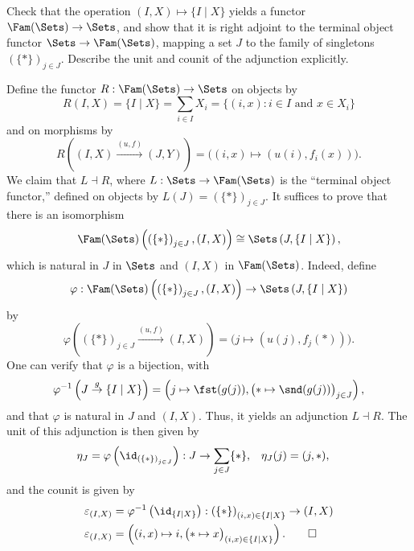 \begin{exercise}
Check that the operation \((I, X) \mapsto \{I \mid X\}\) yields a functor \(\Fam(\Sets) \to \Sets\), and show that it is right adjoint to the terminal object functor \(\Sets \to \Fam(\Sets)\), mapping a set \(J\) to the family of singletons \((\{*\})_{j \in J}\).
Describe the unit and counit of the adjunction explicitly.
\end{exercise}

\begin{solution}
Define the functor \(R : \Fam(\Sets) \to \Sets\) on objects by
\begin{equation*}
R(I, X) = \{I \mid X\} = \sum_{i \in I} X_i = \big\{(i, x) : \text{\(i \in I\) and \(x \in X_i\)}\big\}
\end{equation*}
and on morphisms by
\begin{equation*}
R\left((I, X) \xrightarrow{(u, f)} (J, Y)\right)
= \big((i, x) \mapsto (u(i), f_i(x))\big).
\end{equation*}
We claim that \(L \dashv R\), where \(L : \Sets \to \Fam(\Sets)\) is the ``terminal object functor,'' defined on objects by \(L(J) = \left(\{*\}\right)_{j \in J}\).
It suffices to prove that there is an isomorphism
\begin{equation*}
\Fam(\Sets)\left(\left(\{*\}\right)_{j \in J}, (I, X)\right)
\cong \Sets\left(J, \{I \mid X\}\right),
\end{equation*}
which is natural in \(J\) in \(\Sets\) and \((I, X)\) in \(\Fam(\Sets)\).
Indeed, define
\begin{equation*}
\varphi : \Fam(\Sets)\left(\left(\{*\}\right)_{j \in J}, (I, X)\right)
\to \Sets\left(J, \{I \mid X\}\right)
\end{equation*}
by
\begin{equation*}
\varphi\left(\left(\{*\}\right)_{j \in J} \xrightarrow{(u, f)} (I, X)\right)
= \big(j \mapsto (u(j), f_j(*))\big).
\end{equation*}
One can verify that \(\varphi\) is a bijection, with
\begin{equation*}
\varphi^{-1}\left(J \overset{g}{\to} \{I \mid X\}\right)
= \left(j \mapsto \fst (g(j)) , \big(* \mapsto \snd(g(j))\big)_{j \in J}\right),
\end{equation*}
and that \(\varphi\) is natural in \(J\) and \((I, X)\).
Thus, it yields an adjunction \(L \dashv R\).
The unit of this adjunction is then given by
\begin{align*}
\eta_J &= \varphi\left(\id_{\left(\{*\}\right)_{j \in J}}\right): J \to \sum_{j \in J} \{*\}, &
\eta_J(j) &= (j, *),
\end{align*}
and the counit is given by
\begin{align*}
\varepsilon_{(I, X)}
&= \varphi^{-1}\left(\id_{\{I \mid X\}}\right)
: \left(\{*\}\right)_{(i, x) \in \{I \mid X\}} \to (I , X) \\
\varepsilon_{(I, X)}
&= \left((i, x) \mapsto i, \big(* \mapsto x\big)_{(i, x) \in \{I \mid X\}}\right).
\qedhere
\end{align*}
\end{solution}